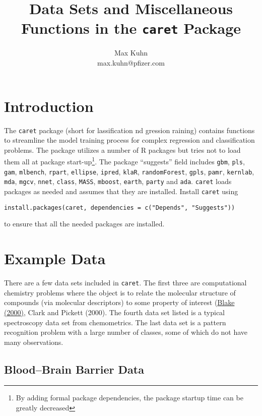 \documentclass[12pt]{article}
\title{Data Sets and Miscellaneous Functions in the {\tt caret} Package}
\author{Max Kuhn \\ max.kuhn@pfizer.com}
\begin{document}
\maketitle

\thispagestyle{empty}
	
\section{Introduction}


The \texttt{caret} package (short for {\bf{\color{blue}{c}}}lassification {\bf{\color{blue}{a}}}nd {\bf{\color{blue}{re}}}gression {\bf{\color{blue}{t}}}raining) contains functions to streamline the model training process for complex regression and classification problems. The package utilizes a number of R packages but tries not to load them all at package start-up\footnote{By adding formal package dependencies, the package startup time can be greatly decreased}. The package ``suggests'' field includes \texttt{gbm}, \texttt{pls}, \texttt{gam}, \texttt{mlbench}, \texttt{rpart}, \texttt{ellipse}, \texttt{ipred}, \texttt{klaR}, \texttt{randomForest}, \texttt{gpls}, \texttt{pamr}, \texttt{kernlab}, \texttt{mda}, \texttt{mgcv}, \texttt{nnet}, \texttt{class}, \texttt{MASS}, \texttt{mboost}, \texttt{earth}, \texttt{party} and \texttt{ada}. \texttt{caret} loads packages as needed and assumes that they are installed. Install \texttt{caret} using 
\begin{Verbatim}
install.packages(caret, dependencies = c("Depends", "Suggests"))
\end{Verbatim}
to ensure that all the needed packages are installed.




\section{Example Data}

There are a few data sets included in \texttt{caret}. The first three are computational chemistry problems where the object is to relate the molecular structure of compounds (via molecular descriptors) to some property of interest (\href{ http://dx.doi.org/10.1016/S1359-6446(99)01451-8}{Blake (2000)}, Clark and Pickett (2000). The fourth data set listed is a typical spectroscopy data set from chemometrics. The last data set is a pattern recognition problem with a large number of classes, some of which do not have many observations.

\subsection{Blood--Brain Barrier Data}
\end{document}
